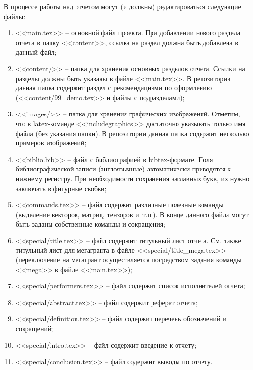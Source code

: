 В процессе работы над отчетом могут (и должны) редактироваться следующие файлы:
\begin{enumerate}
  \item <<main.tex>> --
    основной файл проекта.
    При добавлении нового раздела отчета в папку <<content>>, ссылка на раздел должна быть добавлена в данный файл;

  \item <<content/>> --
    папка для хранения основных разделов отчета.
    Ссылки на разделы должны быть указаны в файле <<main.tex>>.
    В репозитории данная папка содержит раздел с рекомендациями по оформлению (<<content/99\_demo.tex>> и файлы с подразделами);

  \item <<images/>> --
    папка для хранения графических изображений.
    Отметим, что в latex-команде <<includegraphics>> достаточно указывать только имя файла (без указания папки).
    В репозитории данная папка содержит несколько примеров изображений;

  \item <<biblio.bib>> --
    файл с библиографией в bibtex-формате.
    Поля библиографической записи (англоязычные) автоматически приводятся к нижнему регистру.
    При необходимости сохранения заглавных букв, их нужно заключать в фигурные скобки;

  \item <<commands.tex>> --
    файл содержит различные полезные команды (выделение векторов, матриц, тензоров и~т.п.).
    В конце данного файла могут быть заданы собственные команды и сокращения;

  \item <<special/title.tex>> --
    файл содержит титульный лист отчета.
    См. также титульный лист для мегагранта в файле <<special/title\_mega.tex>> (переключение на мегагрант осуществляется посредством задания команды <<mega>> в файле <<main.tex>>);

  \item <<special/performers.tex>> --
    файл содержит список исполнителей отчета;

  \item <<special/abstract.tex>> --
    файл содержит реферат отчета;

  \item <<special/definition.tex>> --
    файл содержит перечень обозначений и сокращений;

  \item <<special/intro.tex>> --
    файл содержит введение к отчету;

  \item <<special/conclusion.tex>> --
    файл содержит выводы по отчету.
\end{enumerate}

